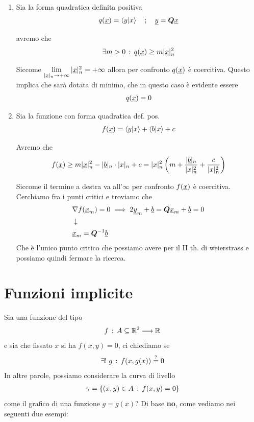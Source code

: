 \begin{enumerate}
	\item Sia la forma quadratica definita positiva
	\begin{align}
		q(\underline{x})= \braket{y|x} \quad ; \quad \underline{y}= \boldsymbol{Q} \underline{x}
	\end{align}
	
	avremo che
	\begin{align}
		\exists m >0 \, : \, q(\underline{x}) \geq m |\underline{x}|_n^2
	\end{align}
	
	Siccome $\underset{|\underline{x}|_n \rightarrow +\infty}{\lim} \,|\underline{x}|_n^2=+\infty$ allora per confronto $q(\underline{x})$ è coercitiva. Questo implica che sarà dotata di minimo, che in questo caso è evidente essere
	\begin{align}
		q(\underline{x})=0
	\end{align}
	
	\item Sia la funzione con forma quadratica def. pos.
	\begin{align}
		f(\underline{x}) =\braket{y|x} + \braket{b|x} + c
	\end{align}
	
	Avremo che
	\begin{align}
		f(\underline{x})\geq m|\underline{x}|_n^2 - |\underline{b}|_n \cdot|x|_n + c = |x|_n^2\left( m + \frac{|\underline{b}|_n}{|x|_n^2} + \frac{c}{|x|_n^2} \right)
	\end{align}
	
	Siccome il termine a destra va all'$\infty$ per confronto $f(\underline{x})$ è coercitiva. Cerchiamo fra i punti critici e troviamo che
	\begin{align}
		{}&\nabla f(\underline{x}_m)=0 \implies 2\underline{y}_m + \underline{b} = \boldsymbol{Q} \underline{x}_m + \underline{b}=0 \nonumber \\ &\downarrow \nonumber \\
		&  \underline{x}_m = \boldsymbol{Q}^{-1} \underline{b}
	\end{align}
	Che è l'unico punto critico che possiamo avere per il II th. di weierstrass e possiamo quindi fermare la ricerca.
\end{enumerate}

\newpage

\section{Funzioni implicite}

Sia una funzione del tipo
\begin{align}
	f \, : \, A\subseteq \mathbb{R}^{2} \longrightarrow \mathbb{R}^{}
\end{align}
e sia che fissato $x$ si ha $f(x,y)=0$, ci chiediamo se
\begin{align}
	\exists! \; g \, : \, f(x,g(x)) \overset{?}{=} 0 
\end{align}
In altre parole, possiamo considerare la curva di livello
\begin{align}
	\gamma = \{ (x,y)\in A \, : \, f(x,y)=0 \}
\end{align}
come il grafico di una funzione $g=g(x)$? Di base \textbf{no}, come vediamo nei seguenti due esempi:

